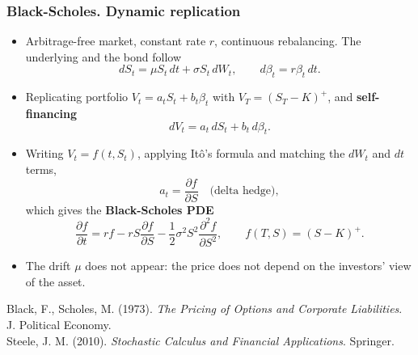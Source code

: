 
\begin{frame}
\frametitle{Black-Scholes. Dynamic replication}
\begin{scriptsize}
\begin{itemize}
\item Arbitrage-free market, constant rate $r$, continuous rebalancing.
The underlying and the bond follow
\begin{equation*}
    dS_t = \mu S_t\, dt + \sigma S_t\, dW_t,
    \qquad
    d\beta_t = r \beta_t\, dt.
\end{equation*}
\item Replicating portfolio $V_t = a_t S_t + b_t \beta_t$ with $V_T = (S_T - K)^+$,
and \textbf{self-financing}
\begin{equation*}
    dV_t = a_t\, dS_t + b_t\, d\beta_t .
\end{equation*}
\item Writing $V_t = f(t, S_t)$, applying It\^{o}'s formula and matching the $dW_t$ and $dt$ terms,
\begin{equation*}
    a_t = \frac{\partial f}{\partial S} \quad \text{(delta hedge)},
\end{equation*}
which gives the \textbf{Black-Scholes PDE}
\begin{equation*}
    \frac{\partial f}{\partial t} =
        r f
        - r S \frac{\partial f}{\partial S}
        - \frac{1}{2} \sigma^2 S^2 \frac{\partial^2 f}{\partial S^2},
    \qquad f(T, S) = (S - K)^+ .
\end{equation*}
\item The drift $\mu$ does not appear: the price does not depend on the investors' view of the asset.
\end{itemize}
\smallskip
Black, F., Scholes, M. (1973). \emph{The Pricing of Options and Corporate Liabilities}. J. Political Economy.\\
Steele, J. M. (2010). \emph{Stochastic Calculus and Financial Applications}. Springer.
\end{scriptsize}
\end{frame}

